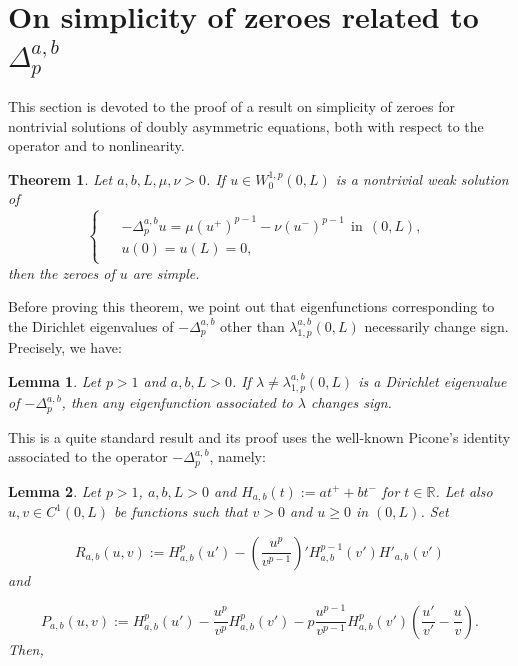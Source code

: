 \documentclass[a4paper,11pt]{article}
\newcommand{\R}{\mathbb{R}}
\newtheorem{teor}{Theorem}[section]
\newtheorem{lema}{Lemma}[section]
\newcommand{\n}{\noindent}
\begin{document}
{\section{On simplicity of zeroes related to $\Delta_{p}^{a,b}$}

This section is devoted to the proof of a result on simplicity of zeroes for nontrivial solutions of doubly asymmetric equations, both with respect to the operator and to nonlinearity.

\begin{teor} \label{T4} Let $a, b, L, \mu, \nu > 0$. If $u \in W_0^{1,p}(0,L)$ is a nontrivial weak solution of
\begin{equation*}
\begin{cases}
\begin{aligned}
& - \Delta_{p}^{a,b} u = \mu (u^+)^{p-1} - \nu (u^-)^{p-1} \ \ \text{in} \ \ (0,L), \\
& u(0) = u(L) = 0,
\end{aligned}
\end{cases}
\end{equation*}
then the zeroes of $u$ are simple.
\end{teor}

Before proving this theorem, we point out that eigenfunctions corresponding to the Dirichlet eigenvalues of $-\Delta_{p}^{a,b}$ other than $\lambda_{1,p}^{a,b}(0,L)$ necessarily change sign. Precisely, we have:

\begin{lema} \label{L2} Let $p > 1$ and $a, b, L > 0$. If $\lambda \neq \lambda_{1,p}^{a,b}(0,L)$ is a Dirichlet eigenvalue of $-\Delta_{p}^{a,b}$, then any eigenfunction associated to $\lambda$ changes sign.
\end{lema}

\n This is a quite standard result and its proof uses the well-known Picone's identity associated to the operator $-\Delta_{p}^{a,b}$, namely:

\begin{lema} \label{L3} Let $p > 1$, $a,b, L > 0$ and $H_{a,b}(t) := at^{+} +bt^{-}$ for $t \in \R$. Let also $u, v \in C^1(0,L)$ be functions such that $v > 0$ and $u \geq 0$ in $(0, L)$. Set

\[
R_{a,b}(u,v) := H_{a,b}^{p}(u') - \left(\frac{u^{p}}{v^{p-1}}\right)'H_{a,b}^{p-1}(v')H'_{a,b}(v')
\]
and

\[
P_{a,b}(u,v) := H_{a,b}^{p}(u') - \frac{u^{p}}{v^{p}}H_{a,b}^{p}(v') - p\frac{u^{p-1}}{v^{p-1}}H_{a,b}^{p}(v')\left(\frac{u'}{v'}-\frac{u}{v}\right).
\]
Then,


\end{lema}}
\end{document}
